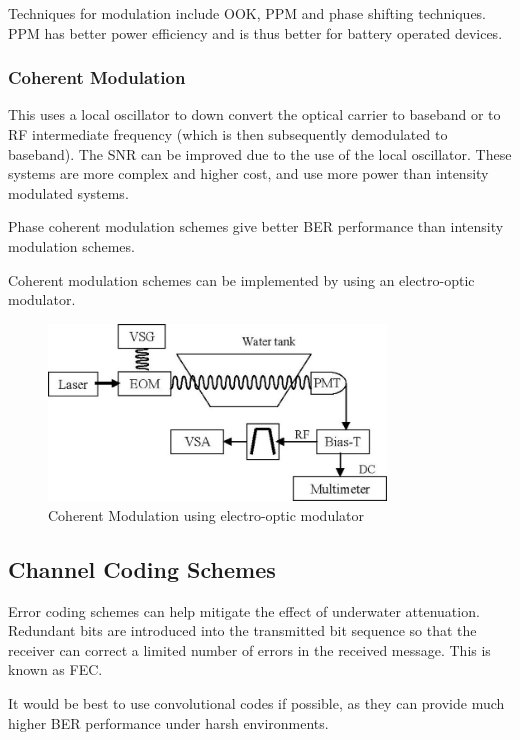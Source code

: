 Techniques for modulation include \ac{OOK}, \ac{PPM} and phase shifting
techniques. \ac{PPM} has better power efficiency and is thus better for
battery operated devices.

\subsubsection{Coherent Modulation}
This uses a local oscillator to down convert the optical carrier to baseband
or to \ac{RF} intermediate frequency (which is then subsequently demodulated
to baseband). The \ac{SNR} can be improved due to the use of the local
oscillator. These systems are more complex and higher cost, and use more power
than intensity modulated systems.

Phase coherent modulation schemes give better \ac{BER} performance than
intensity modulation schemes.

Coherent modulation schemes can be implemented by using an electro-optic
modulator.

\begin{figure}[H]
  \includegraphics[width=0.8\textwidth]{coherent-source.jpg}
  \caption{Coherent Modulation using electro-optic modulator
	   \cite{cochenour_mullen_laux_2007}}
  \label{fig:coherent-modulation}
\end{figure}

\subsection{Channel Coding Schemes}
Error coding schemes can help mitigate the effect of underwater attenuation.
Redundant bits are introduced into the transmitted bit sequence so that the
receiver can correct a limited number of errors in the received message.
This is known as \ac{FEC}.

It would be best to use convolutional codes if possible, as they can provide
much higher \ac{BER} performance under harsh environments.

